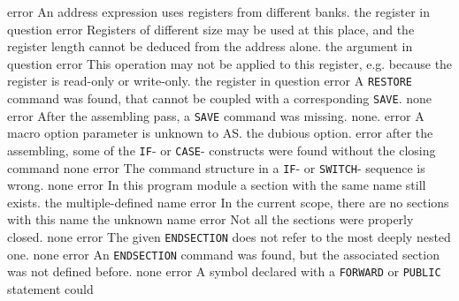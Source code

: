 \documentclass[12pt,twoside]{report}
\newcommand{\tty}[1]{{\tt #1}}
\newcommand{\asname}{{AS}}
\begin{document}
\begin{description}
               {error}
               {An address expression uses registers from different banks.}
               {the register in question}
               {error}
               {Registers of different size may be used at this place, and
                 the register length cannot be deduced from the address alone.}
               {the argument in question}
               {error}
               {This operation may not be applied to this register, e.g. because
                the register is read-only or write-only.}
               {the register in question}
               {error}
               {A \tty{RESTORE} command was found, that cannot be coupled with a
                corresponding \tty{SAVE}.}
               {none}
               {error}
               {After the assembling pass, a \tty{SAVE} command was missing.}
               {none.}
               {error}
               {A macro option parameter is unknown to \asname{}.}
               {the dubious option.}
               {error}
               {after the assembling, some of the \tty{IF}- or \tty{CASE}- constructs
                were found without the closing command}
               {none}
               {error}
               {The command structure in a \tty{IF}- or \tty{SWITCH}- sequence is
                wrong.}
               {none}
               {error}
               {In this program module a section with the same name still
                exists.}
               {the multiple-defined name}
               {error}
               {In the current scope, there are no sections with this name}
               {the unknown name}
               {error}
               {Not all the sections were properly closed.}
               {none}
               {error}
               {The given \tty{ENDSECTION} does not refer to the most
                deeply nested one.}
               {none}
               {error}
               {An \tty{ENDSECTION} command was found, but the associated section
                was not defined before.}
               {none}
               {error}
               {A symbol declared with a \tty{FORWARD} or \tty{PUBLIC} statement could
}
\end{description}
\end{document}

